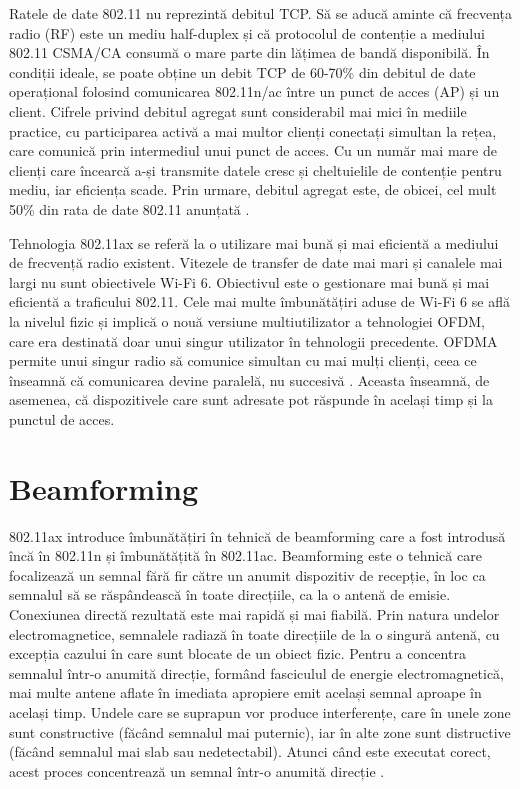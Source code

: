 \documentclass[a4paper,12pt]{report}
\begin{document}
Ratele de date 802.11 nu reprezintă debitul \ac{TCP}.
Să se aducă aminte că frecvența radio (\ac{RF}) este un mediu half-duplex și că protocolul de contenție a mediului 802.11 \ac{CSMA/CA} consumă o mare parte din lățimea de bandă disponibilă.
În condiții ideale, se poate obține un debit \ac{TCP} de 60-70\% din debitul de date operațional folosind comunicarea 802.11n/ac între un punct de acces (\ac{AP}) și un client.
Cifrele privind debitul agregat sunt considerabil mai mici în mediile practice, cu participarea activă a mai multor clienți conectați simultan la rețea, care comunică prin intermediul unui punct de acces.
Cu un număr mai mare de clienți care încearcă a-și transmite datele cresc și cheltuielile de contenție pentru mediu, iar eficiența scade.
Prin urmare, debitul agregat este, de obicei, cel mult 50\% din rata de date 802.11 anunțată \cite{info_802_11ax__q_and_a}.

Tehnologia 802.11ax se referă la o utilizare mai bună și mai eficientă a mediului de frecvență radio existent.
Vitezele de transfer de date mai mari și canalele mai largi nu sunt obiectivele \ac{Wi-Fi} 6.
Obiectivul este o gestionare mai bună și mai eficientă a traficului 802.11.
Cele mai multe îmbunătățiri aduse de \ac{Wi-Fi} 6 se află la nivelul fizic și implică o nouă versiune multiutilizator a tehnologiei \ac{OFDM}, care era destinată doar unui singur utilizator în tehnologii precedente.
\ac{OFDMA} permite unui singur radio să comunice simultan cu mai mulți clienți, ceea ce înseamnă că comunicarea devine paralelă, nu succesivă \cite{OFMDA}.
Aceasta înseamnă, de asemenea, că dispozitivele care sunt adresate pot răspunde în același timp și la punctul de acces.

\section{Beamforming}

802.11ax introduce îmbunătățiri în tehnică de beamforming care a fost introdusă încă în 802.11n și îmbunătățită în 802.11ac.
Beamforming este o tehnică care focalizează un semnal fără fir către un anumit dispozitiv de recepție, în loc ca semnalul să se răspândească în toate direcțiile, ca la o antenă de emisie.
Conexiunea directă rezultată este mai rapidă și mai fiabilă.
Prin natura undelor electromagnetice, semnalele radiază în toate direcțiile de la o singură antenă, cu excepția cazului în care sunt blocate de un obiect fizic. Pentru a concentra semnalul într-o anumită direcție, formând fasciculul de energie electromagnetică, mai multe antene aflate în imediata apropiere emit același semnal aproape în același timp.
Undele care se suprapun vor produce interferențe, care în unele zone sunt constructive (făcând semnalul mai puternic), iar în alte zone sunt distructive (făcând semnalul mai slab sau nedetectabil).
Atunci când este executat corect, acest proces concentrează un semnal într-o anumită direcție \cite{beamforming}.
\end{document}
